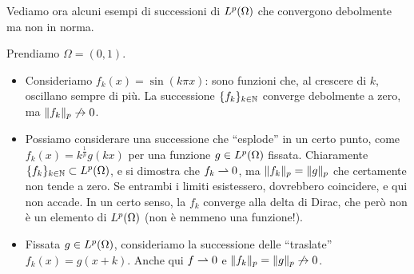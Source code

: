 Vediamo ora alcuni esempi di successioni di $\leb[p]{\Omega}$ che convergono debolmente ma non in norma.
\begin{esempio} \label{es:convergenza-debole-ma-non-forte}
   Prendiamo $\Omega=(0,1)$.
   \begin{itemize}
       \item Consideriamo $f_k(x)=\sin(k\pi x)$: sono funzioni che, al crescere di $k$, oscillano sempre di più.
           La successione $\{f_k\}_{k\in\N}$ converge debolmente a zero, ma $\norm{f_k}_p\not\to 0$.
       \item Possiamo considerare una successione che ``esplode'' in un certo punto, come $f_k(x)=k^\frac1{p}g(kx)$ per una funzione $g\in\leb[p]{\Omega}$ fissata.
           Chiaramente $\{f_k\}_{k\in\N}\subset\leb[p]{\Omega}$, e si dimostra che $f_k\weakto 0$, ma $\norm{f_k}_p=\norm{g}_p$ che certamente non tende a zero.
           Se entrambi i limiti esistessero, dovrebbero coincidere, e qui non accade.
           In un certo senso, la $f_k$ converge alla delta di Dirac, che però non è un elemento di $\leb[p]{\Omega}$ (non è nemmeno una funzione!).
       \item Fissata $g\in\leb[p]{\Omega}$, consideriamo la successione delle ``traslate'' $f_k(x)=g(x+k)$.
           Anche qui $f\weakto 0$ e $\norm{f_k}_p=\norm{g}_p\not\to 0$.
   \end{itemize}
\end{esempio}

